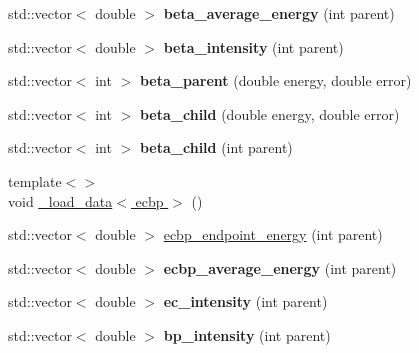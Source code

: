 \begin{DoxyCompactItemize}
\item 
std\+::vector$<$ double $>$ {\bfseries beta\+\_\+average\+\_\+energy} (int parent)\hypertarget{namespacepyne_ab385d0c04c1da2033bdf0e8309a293cb}{}\label{namespacepyne_ab385d0c04c1da2033bdf0e8309a293cb}

\item 
std\+::vector$<$ double $>$ {\bfseries beta\+\_\+intensity} (int parent)\hypertarget{namespacepyne_a818e4cda17d0e3746e7c39c452505f03}{}\label{namespacepyne_a818e4cda17d0e3746e7c39c452505f03}

\item 
std\+::vector$<$ int $>$ {\bfseries beta\+\_\+parent} (double energy, double error)\hypertarget{namespacepyne_a4f6a73d374babad7eae37b1a5ede31b1}{}\label{namespacepyne_a4f6a73d374babad7eae37b1a5ede31b1}

\item 
std\+::vector$<$ int $>$ {\bfseries beta\+\_\+child} (double energy, double error)\hypertarget{namespacepyne_a06a66d50d789c15eb06403145c9e8f78}{}\label{namespacepyne_a06a66d50d789c15eb06403145c9e8f78}

\item 
std\+::vector$<$ int $>$ {\bfseries beta\+\_\+child} (int parent)\hypertarget{namespacepyne_aecf3b1f9104cd326141aaabf6dc1dd85}{}\label{namespacepyne_aecf3b1f9104cd326141aaabf6dc1dd85}

\item 
{\footnotesize template$<$$>$ }\\void \hyperlink{namespacepyne_aa0e5344b00be282952a8da5cc928b387}{\+\_\+load\+\_\+data$<$ ecbp $>$} ()
\item 
std\+::vector$<$ double $>$ \hyperlink{namespacepyne_a01290076b747cd8f6fb8785d698d9319}{ecbp\+\_\+endpoint\+\_\+energy} (int parent)
\item 
std\+::vector$<$ double $>$ {\bfseries ecbp\+\_\+average\+\_\+energy} (int parent)\hypertarget{namespacepyne_aae965f50671162fd430ecc100a6734c3}{}\label{namespacepyne_aae965f50671162fd430ecc100a6734c3}

\item 
std\+::vector$<$ double $>$ {\bfseries ec\+\_\+intensity} (int parent)\hypertarget{namespacepyne_acdd99da92f821b3634d41c217f7ba36c}{}\label{namespacepyne_acdd99da92f821b3634d41c217f7ba36c}

\item 
std\+::vector$<$ double $>$ {\bfseries bp\+\_\+intensity} (int parent)\hypertarget{namespacepyne_ae90f342a67b82fd077368de131ad511f}{}\label{namespacepyne_ae90f342a67b82fd077368de131ad511f}


\end{DoxyCompactItemize}
